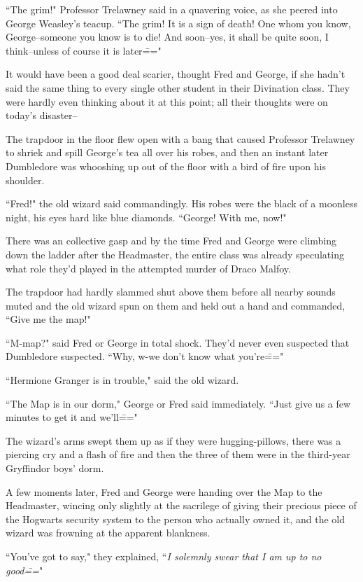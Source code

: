 ``The grim!" Professor Trelawney said in a quavering voice, as she peered into George Weasley's teacup. ``The grim! It is a sign of death! One whom you know, George\---someone you know is to die! And soon\---yes, it shall be quite soon, I think\---unless of course it is later\==="

It would have been a good deal scarier, thought Fred and George, if she hadn't said the same thing to every single other student in their Divination class. They were hardly even thinking about it at this point; all their thoughts were on today's disaster\---

The trapdoor in the floor flew open with a bang that caused Professor Trelawney to shriek and spill George's tea all over his robes, and then an instant later Dumbledore was whooshing up out of the floor with a bird of fire upon his shoulder.

``Fred!" the old wizard said commandingly. His robes were the black of a moonless night, his eyes hard like blue diamonds. ``George! With me, now!"

There was an collective gasp and by the time Fred and George were climbing down the ladder after the Headmaster, the entire class was already speculating what role they'd played in the attempted murder of Draco Malfoy.

The trapdoor had hardly slammed shut above them before all nearby sounds muted and the old wizard spun on them and held out a hand and commanded, ``Give me the map!"

``M-map?" said Fred or George in total shock. They'd never even suspected that Dumbledore suspected. ``Why, w-we don't know what you're\==="

``Hermione Granger is in trouble," said the old wizard.

``The Map is in our dorm," George or Fred said immediately. ``Just give us a few minutes to get it and we'll\==="

The wizard's arms swept them up as if they were hugging-pillows, there was a piercing cry and a flash of fire and then the three of them were in the third-year Gryffindor boys' dorm.

A few moments later, Fred and George were handing over the Map to the Headmaster, wincing only slightly at the sacrilege of giving their precious piece of the Hogwarts security system to the person who actually owned it, and the old wizard was frowning at the apparent blankness.

``You've got to say," they explained, ``\emph{I solemnly swear that I am up to no good\===}"

